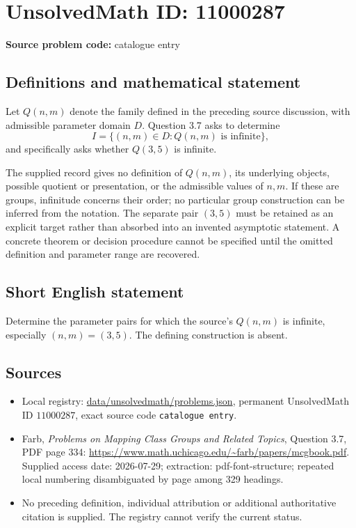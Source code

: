 \documentclass[11pt]{article}
\begin{document}
\section*{UnsolvedMath ID: 11000287}
\textbf{Source problem code:} catalogue entry
\subsection{Definitions and mathematical statement}
Let $Q(n,m)$ denote the family defined in the preceding source discussion, with admissible parameter domain $D$. Question 3.7 asks to determine
\[
 I=\{(n,m)\in D:Q(n,m)\text{ is infinite}\},
\]
and specifically asks whether $Q(3,5)$ is infinite.

The supplied record gives no definition of $Q(n,m)$, its underlying objects, possible quotient or presentation, or the admissible values of $n,m$. If these are groups, infinitude concerns their order; no particular group construction can be inferred from the notation. The separate pair $(3,5)$ must be retained as an explicit target rather than absorbed into an invented asymptotic statement. A concrete theorem or decision procedure cannot be specified until the omitted definition and parameter range are recovered.
\subsection{Short English statement}
Determine the parameter pairs for which the source's $Q(n,m)$ is infinite, especially $(n,m)=(3,5)$. The defining construction is absent.
\subsection{Sources}
\begin{itemize}
\item Local registry: \url{data/unsolvedmath/problems.json}, permanent UnsolvedMath ID $11000287$, exact source code \texttt{catalogue entry}.
\item Farb, \emph{Problems on Mapping Class Groups and Related Topics}, Question 3.7, PDF page 334: \url{https://www.math.uchicago.edu/~farb/papers/mcgbook.pdf}. Supplied access date: 2026-07-29; extraction: pdf-font-structure; repeated local numbering disambiguated by page among 329 headings.
\item No preceding definition, individual attribution or additional authoritative citation is supplied. The registry cannot verify the current status.
\end{itemize}
\end{document}
